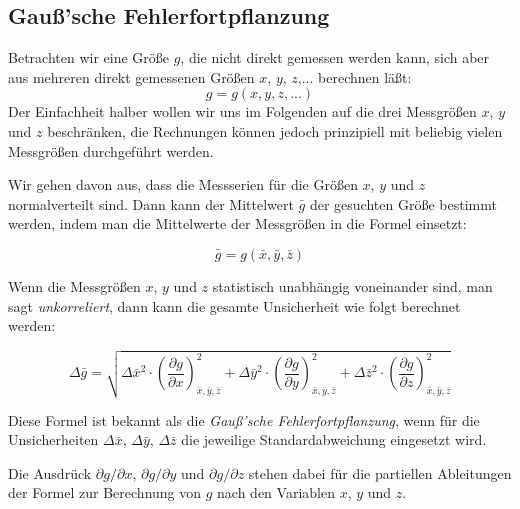 \subsection{Gauß'sche Fehlerfortpflanzung}

Betrachten wir eine Größe $g$, die nicht direkt gemessen werden kann, sich aber aus mehreren direkt gemessenen Größen $x$, $y$, $z$,... berechnen läßt:
\begin{equation}
	g = g(x,y,z,...)
\end{equation}
Der Einfachheit halber wollen wir uns im Folgenden auf die drei Messgrößen $x$, $y$ und $z$ beschränken, die Rechnungen können jedoch prinzipiell mit beliebig vielen Messgrößen durchgeführt werden.

Wir gehen davon aus, dass die Messserien für die Größen $x$, $y$ und $z$ normalverteilt sind. Dann kann der Mittelwert $\bar{g}$ der gesuchten Größe bestimmt werden, indem man die Mittelwerte der Messgrößen in die Formel einsetzt:
\begin{important}
	\begin{equation}
		\bar{g} = g(\bar{x},\bar{y},\bar{z})
	\end{equation}
\end{important}

Wenn die Messgrößen $x$, $y$ und $z$ statistisch unabhängig voneinander sind, man sagt \textit{unkorreliert}, dann kann die gesamte Unsicherheit wie folgt berechnet werden:
\begin{important}
	\begin{equation}
		\Delta\bar{g} = \sqrt{\Delta\bar{x}^2 \cdot \left(\frac{\partial g}{\partial x} \right)^2_{\bar{x},\bar{y},\bar{z}} + \Delta\bar{y}^2 \cdot \left(\frac{\partial g}{\partial y} \right)^2_{\bar{x},\bar{y},\bar{z}} + \Delta\bar{z}^2 \cdot \left(\frac{\partial g}{\partial z} \right)^2_{\bar{x},\bar{y},\bar{z}}}
	\end{equation}
\end{important}

Diese Formel ist bekannt als die \textit{Gauß'sche Fehlerfortpflanzung}, wenn für die Unsicherheiten $\Delta\bar{x}$, $\Delta\bar{y}$, $\Delta\bar{z}$ die jeweilige Standardabweichung eingesetzt wird.

Die Ausdrück $\partial g/\partial x$, $\partial g/\partial y$ und $\partial g/\partial z$ stehen dabei für die partiellen Ableitungen der Formel zur Berechnung von $g$ nach den Variablen $x$, $y$ und $z$.

